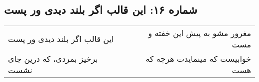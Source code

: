 \begin{center}
\section*{شماره ۱۶: این قالب اگر بلند دیدی ور پست}
\label{sec:016}
\begin{longtable}{l p{0.5cm} r}
این قالب اگر بلند دیدی ور پست
&&
مغرور مشو به پیش این خفته و مست
\\
برخیز بمردی، که درین جای نشست
&&
خوابیست که مینمایدت هرچه که هست
\\
\end{longtable}
\end{center}
